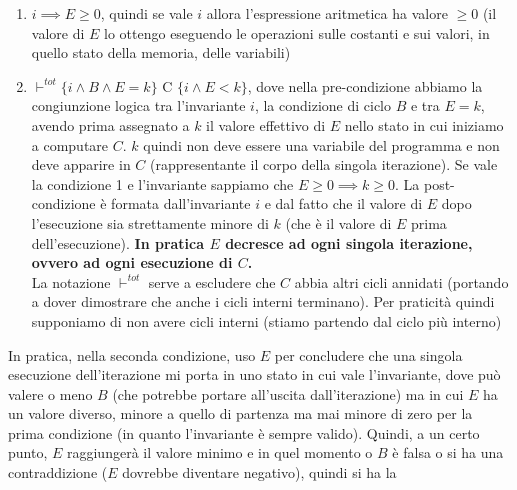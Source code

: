 				      				\begin{enumerate}
				      					\item $i\implies E\geq 0$, quindi se vale $i$ allora l'espressione aritmetica
				      					      ha valore $\geq 0$ (il valore di $E$ lo ottengo eseguendo le operazioni sulle
				      					      costanti e sui valori, in quello stato della memoria, delle variabili)
				    	\label{ConditionTotalCorrectness1}
				      					\item $\vdash^{tot}\{i\land B\land E=k\}\mbox{ C }\{i\land E<k\}$, dove
				      					      nella pre-condizione abbiamo la congiunzione logica tra l'invariante $i$, la
				      					      condizione di ciclo $B$ e tra $E=k$, avendo prima assegnato a $k$ il valore
				      					      effettivo di $E$ nello stato in cui iniziamo a computare $C$. $k$ quindi non
				      					      deve essere una variabile del programma e non deve apparire in $C$
				      					      (rappresentante il corpo della singola iterazione). Se vale la
				      					      condizione 1 e l'invariante sappiamo che $E\geq 0\implies k\geq 0$. La
				      					      post-condizione è formata dall'invariante $i$ e dal fatto che il valore di $E$
				      					      dopo l'esecuzione sia strettamente minore di $k$ (che è il valore di $E$ prima
				      					      dell'esecuzione). \textbf{In pratica $E$ decresce ad ogni singola iterazione, ovvero
				      					      ad ogni esecuzione di $C$.}\\
				      					      La notazione $\vdash^{tot}$ serve a escludere che $C$ abbia altri cicli
				      					      annidati (portando a dover dimostrare che anche i cicli interni
				      					      terminano). Per praticità quindi supponiamo di non avere cicli interni (stiamo
				      					      partendo dal ciclo più interno)
				      					      \label{ConditionTotalCorrectness2}
				      				\end{enumerate}
				      				In pratica, nella seconda condizione, uso $E$ per concludere che una singola
				      				esecuzione dell'iterazione mi porta in uno stato in cui vale l'invariante, dove
				      				può valere o meno $B$ (che potrebbe portare all'uscita dall'iterazione) ma in
				      				cui $E$ ha un valore diverso, minore a quello di partenza ma mai minore di zero per
				      				la prima condizione (in quanto l'invariante è sempre valido). Quindi, a un
				      				certo punto, $E$ raggiungerà il valore minimo e in quel momento o $B$ è falsa o
				      				si ha una contraddizione ($E$ dovrebbe diventare negativo), quindi si ha la
